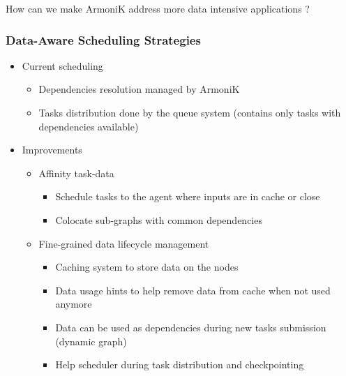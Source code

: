 \documentclass[10pt,aspectratio=1609]{beamer}
\begin{document}
\begin{section}{How can we make ArmoniK address more data intensive applications ?}

  \begin{frame}
    \frametitle{Data-Aware Scheduling Strategies}
    \begin{itemize}
      \item Current scheduling
      \begin{itemize}
        \item Dependencies resolution managed by ArmoniK
        \item Tasks distribution done by the queue system (contains only tasks with dependencies available)
      \end{itemize}
      \item Improvements
      \begin{itemize}
        \item Affinity task-data
        \begin{itemize}
          \item Schedule tasks to the agent where inputs are in cache or close
          \item Colocate sub-graphs with common dependencies
        \end{itemize}
        \item Fine-grained data lifecycle management
        \begin{itemize}
          \item Caching system to store data on the nodes
          \item Data usage hints to help remove data from cache when not used anymore
          \item Data can be used as dependencies during new tasks submission (dynamic graph)
          \item Help scheduler during task distribution and checkpointing
        \end{itemize}
      \end{itemize}
    \end{itemize}
  \end{frame}


\end{section}
\end{document}
